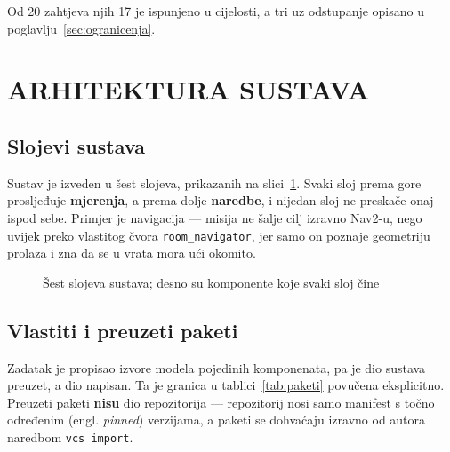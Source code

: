 \documentclass[12pt,a4paper]{article}
\begin{document}
Od 20 zahtjeva njih 17 je ispunjeno u cijelosti, a tri uz odstupanje opisano u
poglavlju~\ref{sec:ogranicenja}.

\section{ARHITEKTURA SUSTAVA}
\label{sec:arhitektura}

\subsection{Slojevi sustava}

Sustav je izveden u šest slojeva, prikazanih na slici~\ref{fig:slojevi}. Svaki sloj prema gore
prosljeđuje \textbf{mjerenja}, a prema dolje \textbf{naredbe}, i nijedan sloj ne preskače onaj
ispod sebe. Primjer je navigacija --- misija ne šalje cilj izravno Nav2-u, nego uvijek preko
vlastitog čvora \texttt{room\_navigator}, jer samo on poznaje geometriju prolaza i zna da se u
vrata mora ući okomito.

\begin{figure}[!htbp]
    \centering
    \resizebox{0.86\textwidth}{!}{}
    \caption{Šest slojeva sustava; desno su komponente koje svaki sloj čine}
    \label{fig:slojevi}
\end{figure}

\subsection{Vlastiti i preuzeti paketi}

Zadatak je propisao izvore modela pojedinih komponenata, pa je dio sustava preuzet, a dio
napisan. Ta je granica u tablici~\ref{tab:paketi} povučena eksplicitno. Preuzeti paketi
\textbf{nisu} dio repozitorija --- repozitorij nosi samo manifest s točno određenim (engl.
\textit{pinned}) verzijama, a paketi se dohvaćaju izravno od autora naredbom \texttt{vcs import}.
\end{document}
